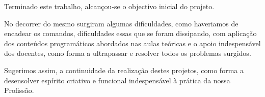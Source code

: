 \documentclass[4apaper]{report}
\begin{document}
Terminado este trabalho, alcançou-se o objectivo inicial do projeto. 

No decorrer do mesmo surgiram algumas dificuldades, como haveriamos de encadear os comandos, dificuldades essas que se foram dissipando, com aplicação dos conteúdos programáticos abordados nas aulas teóricas e o apoio indespensável dos docentes, como forma a ultrapassar e resolver todos os problemas surgidos.

Sugerimos assim, a continuidade da realização destes projetos, como forma a desensolver espírito criativo e funcional indespensável à prática da nossa Profissão. 
\end{document}
